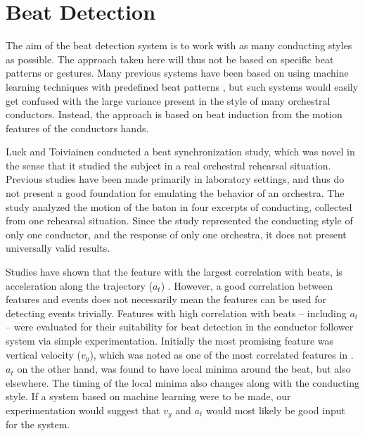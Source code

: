 \section{Beat Detection}
\label{sec:beat_detection}

The aim of the beat detection system is
to work with as many conducting styles as possible.
The approach taken here will thus not be
based on specific beat patterns or gestures.
Many previous systems have been based on
using machine learning techniques with
predefined beat patterns \cite{Fabiani2012},
but such systems would easily get confused with
the large variance present in the style of
many orchestral conductors.
Instead, the approach is based on beat induction
from the motion features of the conductors hands.

Luck and Toiviainen \cite{luck2006}
conducted a beat synchronization study,
which was novel in the sense that it studied
the subject in a real orchestral rehearsal situation.
Previous studies have been made primarily in laboratory settings,
and thus do not present a good foundation
for emulating the behavior of an orchestra.
The study analyzed the motion of the baton
in four excerpts of conducting,
collected from one rehearsal situation.
Since the study represented the conducting style of only one conductor,
and the response of only one orchestra,
it does not present universally valid results.

Studies have shown
that the feature with the largest correlation with beats,
is acceleration along the trajectory ($a_t$)
\cite{LuckSloboda2008, LuckSloboda2009}.
However, a good correlation between features and events
does not necessarily mean the features can be used
for detecting events trivially.
Features with high correlation with beats --
including $a_t$ --
were evaluated for their suitability for beat detection
in the conductor follower system
via simple experimentation.
Initially the most promising feature was
vertical velocity ($v_y$),
which was noted as one of the most correlated features in \cite{luck2006}.
$a_t$ on the other hand, was found to have local minima
around the beat, but also elsewhere.
The timing of the local minima also changes along with the conducting style.
If a system based on machine learning were to be made,
our experimentation would suggest that $v_y$ and $a_t$
would most likely be good input for the system.


